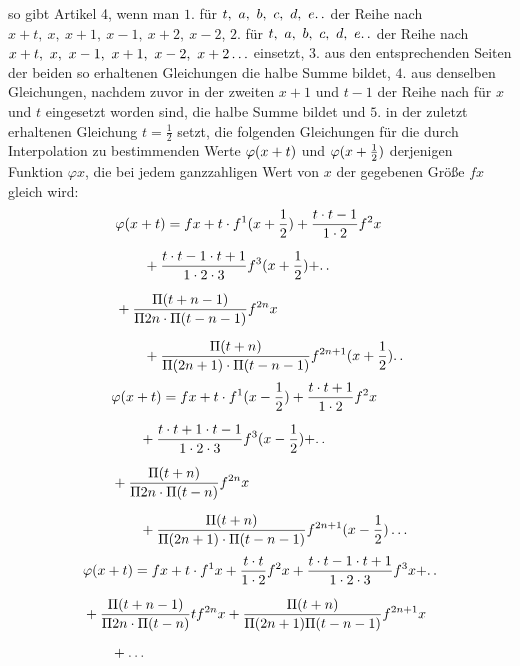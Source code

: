 so gibt Artikel 4, wenn man $1.$ für $t,\allowbreak{}\ a,\allowbreak{}\ b,\allowbreak{}\ c,\allowbreak{}\ d,\allowbreak{}\ e\ldotp\ldotp$
der Reihe nach $x+t,\allowbreak{}\ x,\allowbreak{}\ x+1,\allowbreak{}\ x-1,\allowbreak{}\ x+2,\allowbreak{}\ x-2$, $2.$ für
$t,\allowbreak{}\ a,\allowbreak{}\ b,\allowbreak{}\ c,\allowbreak{}\ d,\allowbreak{}\ e\ldotp\ldotp$ der Reihe nach $x+t,\allowbreak{}\ x,\allowbreak{}\ x-1,\allowbreak{}\ x+1,\allowbreak{}\ x-2,\allowbreak{}\ x+2\mathinner{.\,\allowbreak{}.\,\allowbreak{}.}$ einsetzt,
$3.$ aus den entsprechenden Seiten der beiden so erhaltenen Gleichungen die halbe Summe bildet,
$4.$ aus denselben Gleichungen, nachdem zuvor in der zweiten $x+1$ und $t-1$ der Reihe nach für $x$ und $t$ eingesetzt worden sind,
die halbe Summe bildet und $5.$ in der zuletzt erhaltenen Gleichung $t=\tfrac12$ setzt,
die folgenden Gleichungen für die durch Interpolation zu bestimmenden Werte $\varphi(x+\nobreak{}t)$ und
$\varphi(x+\nobreak{}\tfrac12)$ derjenigen Funktion $\varphi x$, die bei jedem ganzzahligen Wert
von $x$ der gegebenen Größe $fx$ gleich wird:
\[
\begin{aligned}
&\varphi(x+t)={}fx+t\cdot f^{1}(x+\frac12)+\frac{t\cdot t-1}{1\cdot2}f^{2}x
\\[6pt]
&\qquad{}+\frac{t\cdot t-1\cdot t+1}{1\cdot2\cdot3}f^{3}(x+\frac12)+\ldotp\ldotp\\[6pt]
&+\frac{\Pi(t+n-1)}{\Pi 2n\cdot\Pi(t-n-1)}f^{2n}x
\\[6pt]
&\qquad{}+\frac{\Pi(t+n)}{\Pi(2n+1)\cdot\Pi(t-n-1)}f^{2n+1}(x+\frac12)\ldotp\ldotp
\end{aligned}
\]
\[
\begin{aligned}
&\varphi(x+t)={}fx+t\cdot f^{1}(x-\frac12)+\frac{t\cdot t+1}{1\cdot2}f^{2}x
\\[6pt]
&\qquad{}+\frac{t\cdot t+1\cdot t-1}{1\cdot2\cdot3}f^{3}(x-\frac12)+\ldotp\ldotp\\[6pt]
&+\frac{\Pi(t+n)}{\Pi 2n\cdot\Pi(t-n)}f^{2n}x
\\[6pt]
&\qquad{}+\frac{\Pi(t+n)}{\Pi(2n+1)\cdot\Pi(t-n-1)}f^{2n+1}(x-\frac12)\mathinner{.\,.\,.}
\end{aligned}
\]
\[
\begin{aligned}
&\varphi(x+t)={}fx+t\cdot f^{1}x+\frac{t\cdot t}{1\cdot2}f^{2}x
+\frac{t\cdot t-1\cdot t+1}{1\cdot2\cdot3}f^{3}x+\ldotp\ldotp\\[6pt]
&+\frac{\Pi(t+n-1)}{\Pi 2n\cdot\Pi(t-n)}t f^{2n}x
+\frac{\Pi(t+n)}{\Pi(2n+1)\Pi(t-n-1)}f^{2n+1}x\\[6pt]
&\qquad{}+\mathinner{.\,.\,.}
\end{aligned}
\]
